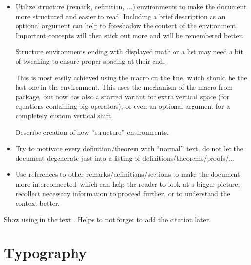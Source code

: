 \begin{itemize}
    \item Utilize structure (remark, definition, ...) environments to make the document more structured and easier to read.
          Including a brief description as an optional argument can help to foreshadow the content of the environment.
          Important concepts will then stick out more and will be remembered better.
          \begin{remark}
              Structure environments ending with displayed math or a list may need a bit of tweaking to ensure proper spacing at their end.

              This is most easily achieved using the \custommacro{\qedhere} macro on the line, which should be the last one in the environment.
              This uses the mechanism of the \macro{\qedhere} macro from  package, but now has also a starred variant for extra vertical space (for equations containing big operators), or even an optional argument for a completely custom vertical shift.
          \end{remark}
          \begin{Todo}
              Describe creation of new \enquote{structure} environments.
          \end{Todo}
    \item Try to motivate every definition/theorem with \enquote{normal} text, do not let the document degenerate just into a listing of definitions/theorems/proofs/...
    \item Use references to other remarks/definitions/sections to make the document more interconnected, which can help the reader to look at a bigger picture, recollect necessary information to proceed further, or to understand the context better.
\end{itemize}

\begin{Todo}
    Show using  in the text \autocite{TODO}.
    Helps to not forget to add the citation later.
\end{Todo}


\section{Typography}%
\label{sec:Typography}

